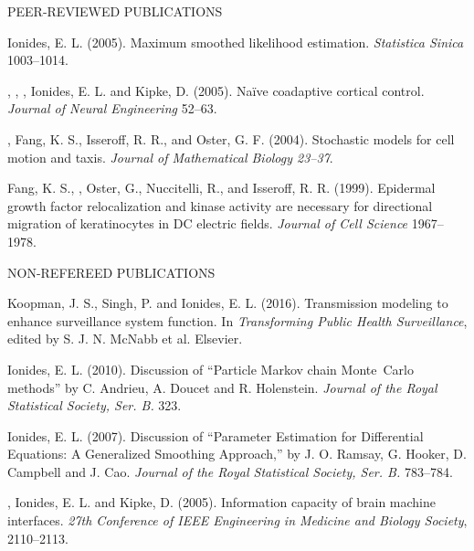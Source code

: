\begin{reflist}{PEER-REVIEWED PUBLICATIONS}
\item\formal{[[\ionidesSINICA] ]} 
Ionides, E. L. (2005). Maximum smoothed likelihood estimation.
 {\em Statistica Sinica} {}{\separator}1003--1014.


\item\formal{[[\gageJNE] ]}  
,  , 
   , Ionides, E. L. and
  Kipke, D. (2005). Na\"{i}ve coadaptive cortical control. 
  {\em Journal of Neural Engineering} {}{\separator}52--63. 


\item\formal{[[\ionidesJMB] ]}  
 ,  Fang, K. S.,  Isseroff, R. R., and  Oster, G. F. (2004).  Stochastic models for cell motion and taxis. {\em
 Journal of Mathematical Biology {}{\separator}23--37}.


\item\formal{[[\fangJCS] ]}  
 Fang, K. S.,  ,  Oster, G.,  
Nuccitelli, R.,   and Isseroff, R. R. (1999). Epidermal growth factor 
relocalization and kinase activity are necessary for directional
migration of keratinocytes in DC electric fields. 
{\em Journal of Cell Science} {}{\separator}1967--1978.
\end{reflist}


\lsp


\begin{reflist} {NON-REFEREED PUBLICATIONS}

\item
Koopman, J. S., Singh, P. and Ionides, E. L. (2016). Transmission modeling to enhance surveillance system function. In {\em Transforming Public Health Surveillance}, edited by S. J. N. McNabb et al. Elsevier.

\item\formal{[[\ionidesJRSSBb] ]} 
Ionides, E. L. (2010). Discussion of ``Particle Markov chain Monte~Carlo methods'' by C. Andrieu, A. Doucet and R. Holenstein.
{\em Journal of the Royal Statistical Society, Ser. B.} {}{\separator}323.

\item\formal{[[\ionidesJRSSBa] ]}  
Ionides, E. L. (2007). Discussion of ``Parameter Estimation for Differential Equations: A Generalized Smoothing Approach,'' by J. O. Ramsay, G. Hooker, D. Campbell and J. Cao. 
{\em Journal of the Royal Statistical Society, Ser. B.} {}{\separator}783--784.

\item\formal{[[\gageEMBS] ]}  
, Ionides, E. L. and
  Kipke, D. (2005). Information capacity of brain machine
  interfaces. {\em 27th Conference of IEEE Engineering in
  Medicine and Biology Society}, 2110--2113.


\end{reflist}

